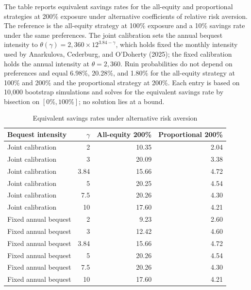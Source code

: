 \begin{table}[p]\centering
\caption{Equivalent savings rates under alternative risk aversion}\label{tab:restored-gamma}
\begin{minipage}{\linewidth}\small The table reports equivalent savings rates for the all-equity and proportional strategies at 200\% exposure under alternative coefficients of relative risk aversion. The reference is the all-equity strategy at 100\% exposure and a 10\% savings rate under the same preferences. The joint calibration sets the annual bequest intensity to $\theta(\gamma)=2{,}360\times12^{3.84-\gamma}$, which holds fixed the monthly intensity used by Anarkulova, Cederburg, and O'Doherty (2025); the fixed calibration holds the annual intensity at $\theta=2{,}360$. Ruin probabilities do not depend on preferences and equal 6.98\%, 20.28\%, and 1.80\% for the all-equity strategy at 100\% and 200\% and the proportional strategy at 200\%. Each entry is based on 10,000 bootstrap simulations and solves for the equivalent savings rate by bisection on $[0\%,100\%]$; no solution lies at a bound.\end{minipage}
\medskip

{\small\setlength{\tabcolsep}{4pt}\begin{tabular}{lrrr}\toprule
Bequest intensity & $\gamma$ & All-equity 200\% & Proportional 200\% \\ \midrule
Joint calibration & 2 & 10.35 & 2.04 \\
Joint calibration & 3 & 20.09 & 3.38 \\
Joint calibration & 3.84 & 15.66 & 4.72 \\
Joint calibration & 5 & 20.25 & 4.54 \\
Joint calibration & 7.5 & 20.26 & 4.30 \\
Joint calibration & 10 & 17.60 & 4.21 \\
Fixed annual bequest & 2 & 9.23 & 2.60 \\
Fixed annual bequest & 3 & 12.42 & 4.60 \\
Fixed annual bequest & 3.84 & 15.66 & 4.72 \\
Fixed annual bequest & 5 & 20.26 & 4.54 \\
Fixed annual bequest & 7.5 & 20.26 & 4.30 \\
Fixed annual bequest & 10 & 17.60 & 4.21 \\
\bottomrule\end{tabular}}
\end{table}
